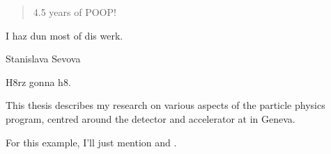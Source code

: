
\begin{abstract}%
  4.5 years of POOP!
\end{abstract}


\begin{declaration}
        I haz dun most of dis werk.     
  \vspace*{1cm}
  \begin{flushright}
    Stanislava Sevova
  \end{flushright}
\end{declaration}


\begin{acknowledgements}
        H8rz gonna h8.
\end{acknowledgements}


\begin{preface}
        This thesis describes my research on various aspects of the \CMS particle physics program, centred around the \CMS detector and \LHC accelerator at \CERN in Geneva.

  \noindent
  For this example, I'll just mention 
  and .
\end{preface}

\tableofcontents


\thispagestyle{empty}

